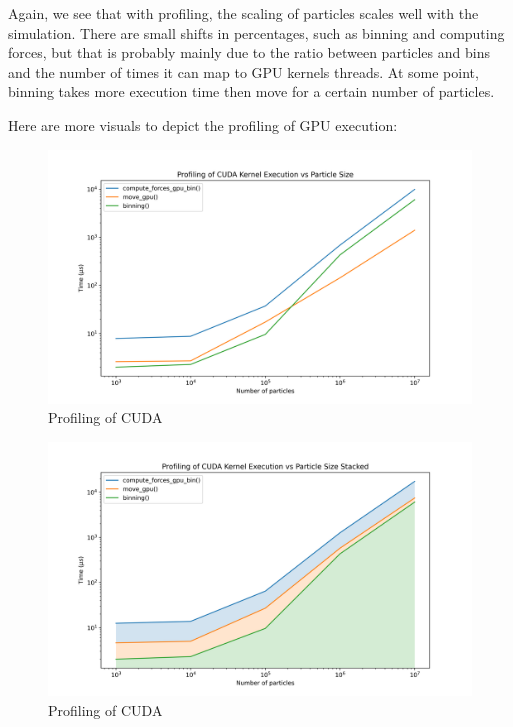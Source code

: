 \documentclass{article}
\begin{document}
Again, we see that with profiling, the scaling of particles scales well with the simulation. There are small shifts in percentages, such as binning and computing forces, but that is probably mainly due to the ratio between particles and bins and the number of times it can map to GPU kernels threads. At some point, binning takes more execution time then move for a certain number of particles.

Here are more visuals to depict the profiling of GPU execution: \\
\begin{figure}[H]
	\centerline{\includegraphics[width=6in]{figures/profiling.png}}
	\caption{Profiling of CUDA}
	\label{fig:profile}
\end{figure}


\begin{figure}[H]
	\centerline{\includegraphics[width=6in]{figures/profiling-stacked.png}}
	\caption{Profiling of CUDA}
	\label{fig:profile-stacked}
\end{figure}
\end{document}
